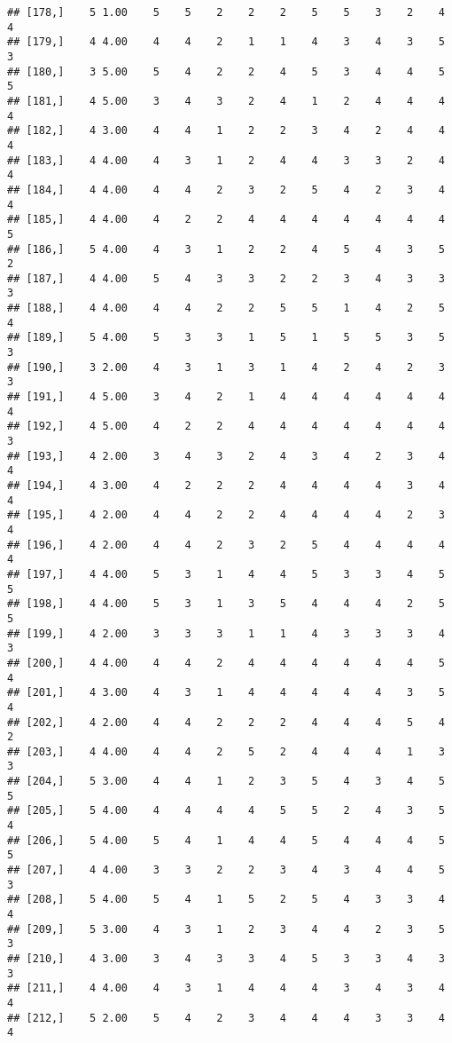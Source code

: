 \documentclass[]{article}
\begin{document}
\begin{verbatim}
## [178,]    5 1.00    5    5    2    2    2    5    5    3    2    4    4
## [179,]    4 4.00    4    4    2    1    1    4    3    4    3    5    3
## [180,]    3 5.00    5    4    2    2    4    5    3    4    4    5    5
## [181,]    4 5.00    3    4    3    2    4    1    2    4    4    4    4
## [182,]    4 3.00    4    4    1    2    2    3    4    2    4    4    4
## [183,]    4 4.00    4    3    1    2    4    4    3    3    2    4    4
## [184,]    4 4.00    4    4    2    3    2    5    4    2    3    4    4
## [185,]    4 4.00    4    2    2    4    4    4    4    4    4    4    5
## [186,]    5 4.00    4    3    1    2    2    4    5    4    3    5    2
## [187,]    4 4.00    5    4    3    3    2    2    3    4    3    3    3
## [188,]    4 4.00    4    4    2    2    5    5    1    4    2    5    4
## [189,]    5 4.00    5    3    3    1    5    1    5    5    3    5    3
## [190,]    3 2.00    4    3    1    3    1    4    2    4    2    3    3
## [191,]    4 5.00    3    4    2    1    4    4    4    4    4    4    4
## [192,]    4 5.00    4    2    2    4    4    4    4    4    4    4    3
## [193,]    4 2.00    3    4    3    2    4    3    4    2    3    4    4
## [194,]    4 3.00    4    2    2    2    4    4    4    4    3    4    4
## [195,]    4 2.00    4    4    2    2    4    4    4    4    2    3    4
## [196,]    4 2.00    4    4    2    3    2    5    4    4    4    4    4
## [197,]    4 4.00    5    3    1    4    4    5    3    3    4    5    5
## [198,]    4 4.00    5    3    1    3    5    4    4    4    2    5    5
## [199,]    4 2.00    3    3    3    1    1    4    3    3    3    4    3
## [200,]    4 4.00    4    4    2    4    4    4    4    4    4    5    4
## [201,]    4 3.00    4    3    1    4    4    4    4    4    3    5    4
## [202,]    4 2.00    4    4    2    2    2    4    4    4    5    4    2
## [203,]    4 4.00    4    4    2    5    2    4    4    4    1    3    3
## [204,]    5 3.00    4    4    1    2    3    5    4    3    4    5    5
## [205,]    5 4.00    4    4    4    4    5    5    2    4    3    5    4
## [206,]    5 4.00    5    4    1    4    4    5    4    4    4    5    5
## [207,]    4 4.00    3    3    2    2    3    4    3    4    4    5    3
## [208,]    5 4.00    5    4    1    5    2    5    4    3    3    4    4
## [209,]    5 3.00    4    3    1    2    3    4    4    2    3    5    3
## [210,]    4 3.00    3    4    3    3    4    5    3    3    4    3    3
## [211,]    4 4.00    4    3    1    4    4    4    3    4    3    4    4
## [212,]    5 2.00    5    4    2    3    4    4    4    3    3    4    4

\end{verbatim}
\end{document}
